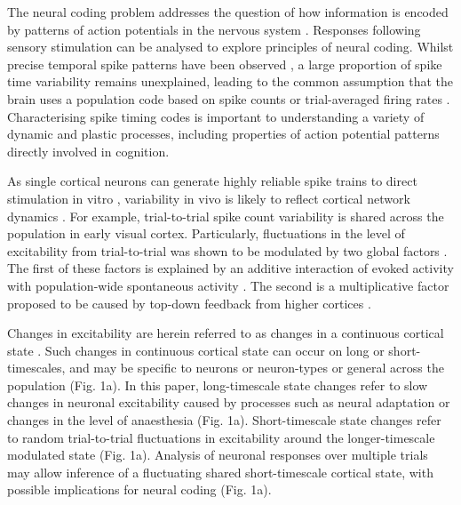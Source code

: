 \documentclass{article}
\begin{document}
The neural coding problem addresses the question of how information is encoded by patterns of action potentials in the nervous system \cite{gerstner1997neural, johnson2000neural, stein2005neuronal, gerstner2014neuronal}. Responses following sensory stimulation can be analysed to explore principles of neural coding.
Whilst precise temporal spike patterns have been observed \cite{uzzell2004precision, johansson2004first, gollisch2008rapid, storchi2012comparison, reinagel2002precise, reyes2014laminar}, a large proportion of spike time variability remains unexplained, leading to the common assumption that the brain uses a population code based on spike counts \cite{reyes2015high, lin2015nature} or trial-averaged firing rates \cite{hong2016explicit, chang2017code, kar2019evidence, stringer2019high}. Characterising spike timing codes is important to understanding a variety of dynamic and plastic processes, including properties of action potential patterns directly involved in cognition.


As single cortical neurons can generate highly reliable spike trains to direct stimulation in vitro \cite{mainen1995reliability}, variability in vivo is likely to reflect 
cortical network dynamics \cite{carandini2004amplification}. 
For example, trial-to-trial spike count variability is shared across the population \cite{scholvinck2015cortical, lin2015nature} in early visual cortex.
Particularly, fluctuations in the level of excitability from trial-to-trial was shown to be modulated by two global factors \cite{lin2015nature}. The first of these factors is explained by an additive interaction of evoked activity with population-wide spontaneous activity \cite{arieli1996dynamics, scholvinck2015cortical}. The second is a multiplicative factor proposed to be caused by top-down feedback from higher cortices \cite{lin2015nature}. 



Changes in excitability are herein referred to as changes in a continuous cortical state \cite{scholvinck2015cortical}.
Such changes in continuous cortical state can occur on long or short-timescales, and may be specific to neurons or neuron-types or general across the population (Fig. 1a).
In this paper, long-timescale state changes refer to slow changes in neuronal excitability caused by processes such as neural adaptation \cite{dragoi2002dynamics, ulanovsky2003processing, sharpee2006adaptive} or changes in the level of anaesthesia (Fig. 1a). Short-timescale state changes refer to random trial-to-trial fluctuations in excitability around the longer-timescale modulated state (Fig. 1a). Analysis of neuronal responses over multiple trials may allow inference of a fluctuating shared short-timescale cortical state, with possible implications for neural coding (Fig. 1a). 
\end{document}
